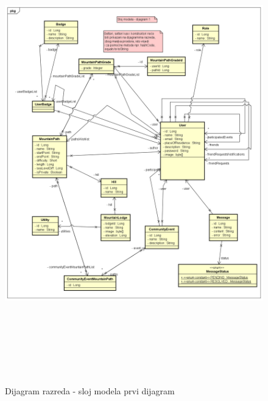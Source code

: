 			\begin{figure}[H]
				\includegraphics[scale=0.6, height=200mm, width=165mm]{dijagrami/model-dijagram1} %
				\centering
				\caption{Dijagram razreda - sloj modela prvi dijagram}
				\label{fig:dijagrami_razreda2}
			\end{figure}
